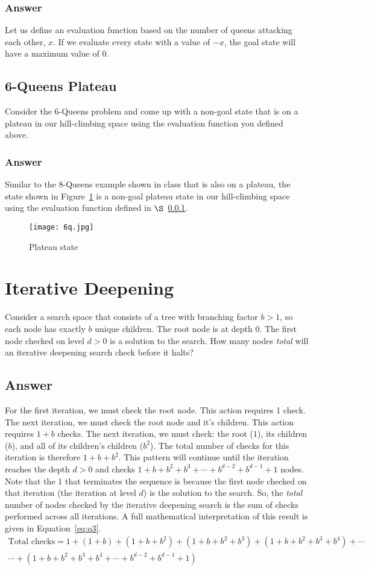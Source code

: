 \documentclass[12pt,letterpaper,titlepage]{article}
\begin{document}
\subsubsection{Answer}
\label{evalq}
Let us define an evaluation function based on the number of queens attacking each other, $x$. If we evaluate every state with a value of $-x$, the goal state will have a maximum value of $0$.
\label{2part2}
\subsection[Part 3]{6-Queens Plateau}
Consider the 6-Queens problem and come up with a non-goal state that is on a plateau  in our hill-climbing space using the evaluation function you defined above.
\subsubsection{Answer}
Similar to the 8-Queens example shown in class that is also on a plateau, the state shown in Figure~\ref{fig:6q} is a non-goal plateau state in our hill-climbing space using the evaluation function defined in $\S$~\ref{evalq}.
\begin{figure}[h]
\centering
\texttt{[image: 6q.jpg]}
\caption{Plateau state}
\label{fig:6q}
\end{figure}
\label{2part3}
\section[Question 3]{Iterative Deepening}
\label{q3}
Consider a search space that consists of a tree with branching factor $b>1$, so each node has exactly $b$ unique children. The root node is at depth $0$. The first node checked on level $d>0$ is a solution to the search. How many nodes \textit{total} will an iterative deepening search check before it halts?
\subsection{Answer}
For the first iteration, we must check the root node. This action requires 1 check. The next iteration, we must check the root node and it's children. This action requires $1+b$ checks. The next iteration, we must check: the root ($1$), its children ($b$), and all of its children's children ($b^2$). The total number of checks for this iteration is therefore $1+b+b^2$. This pattern will continue until the iteration reaches the depth $d>0$ and checks $1+b+b^2+b^3+\cdots+b^{d-2}+b^{d-1}+1$ nodes. Note that the $1$ that terminates the sequence is because the first node checked on that iteration (the iteration at level $d$) is the solution to the search. So, the \textit{total} number of nodes checked by the iterative deepening search is the sum of checks performed across all iterations. A full mathematical interpretation of this result is given in Equation~\ref{eq:q3}.
\begin{multline}
\label{eq:q3}
\text{Total checks} = 1 + \left(1+b\right) + \left(1+b+b^2\right) + \left(1+b+b^2+b^3\right) + \left(1+b+b^2+b^3+b^4\right) + \cdots\\
\cdots + \left(1+b+b^2+b^3+b^4 +\cdots+b^{d-2}+b^{d-1}+1\right)
\end{multline}
\end{document}
